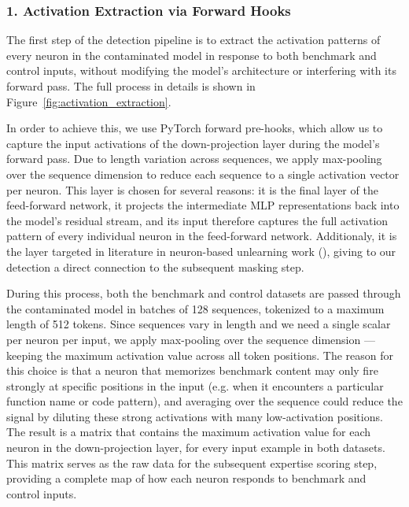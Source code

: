 \documentclass[mscthesis]{usiinfthesis}
\begin{document}
\subsubsection{1. Activation Extraction via Forward Hooks} 
The first step of the detection pipeline is to extract the activation patterns of every neuron in the contaminated model in response to both benchmark and control inputs, without modifying the model's architecture 
or interfering with its forward pass. The full process in details is shown in Figure~\ref{fig:activation_extraction}.
\par\vspace{1em}
In order to achieve this, we use PyTorch forward pre-hooks, which allow us to capture the input activations of the down-projection layer during the model's forward pass.
Due to length variation across sequences, we apply max-pooling over the sequence dimension to reduce each sequence to a single activation vector per neuron.
This layer is chosen for several reasons: it is the final layer of the feed-forward network, it projects the intermediate MLP representations back into the model's residual stream,
and its input therefore captures the full activation pattern of every individual neuron in the feed-forward network. 
Additionaly, it is the layer targeted in literature in neuron-based unlearning work (\citet{kojima2024multilingualabilitydecoderbasedpretrained}), giving to our detection a direct connection to the subsequent masking step.
\par\vspace{1em}
During this process, both the benchmark and control datasets are passed through the contaminated model in batches of 128 sequences, tokenized to a maximum length of 512 tokens. 
Since sequences vary in length and we need a single scalar per neuron per input, we apply max-pooling over the sequence dimension --- keeping the maximum activation value across all token positions. 
The reason for this choice is that a neuron that memorizes benchmark content may only fire strongly at specific positions in the input (e.g. when it encounters a particular function name or code pattern), and averaging over the sequence could reduce the signal by diluting these strong activations with many low-activation positions.
The result is a matrix that contains the maximum activation value for each neuron in the down-projection layer, for every input example in both datasets. This matrix serves as the raw data for the subsequent expertise scoring step, providing a complete map of how each neuron responds to benchmark and control inputs.
\end{document}
